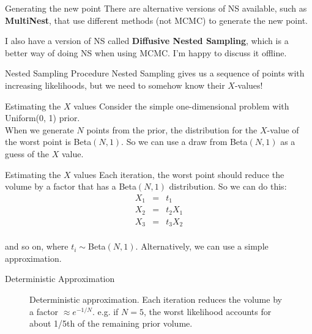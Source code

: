\documentclass{beamer}
\begin{document}
\begin{frame}[t]{Generating the new point}
There are alternative versions of NS available, such as {\bf MultiNest}, that
use different methods (not MCMC) to generate the new point.\\
\vspace{20pt}

I also have a version of NS called {\bf Diffusive Nested Sampling}, which is
a better way of doing NS when using MCMC. I'm happy to discuss it offline.
\end{frame}


\begin{frame}[t]{Nested Sampling Procedure}
Nested Sampling gives us a sequence of points with increasing likelihoods,
but we need to somehow know their $X$-values!
\end{frame}

\begin{frame}[t]{Estimating the $X$ values}
Consider the simple one-dimensional problem with Uniform(0, 1) prior.\\

\vspace{20pt}
When we generate $N$ points from the prior, the distribution for the $X$-value
of the worst point is Beta$(N, 1)$. So we can use a draw from Beta$(N,1)$ as
a guess of the $X$ value.
\end{frame}

\begin{frame}[t]{Estimating the $X$ values}
Each iteration, the worst point should reduce the volume by a factor that has
a Beta$(N, 1)$ distribution. So we can do this:
\begin{eqnarray*}
X_1 &=& t_1\\
X_2 &=& t_2X_1\\
X_3 &=& t_3X_2\\
\end{eqnarray*}

and so on, where $t_i \sim $Beta$(N,1)$. Alternatively, we can use a simple
approximation.
\end{frame}

\begin{frame}[t]{Deterministic Approximation}
\begin{figure}[]    		
		\caption{Deterministic approximation. Each iteration reduces
the volume by a factor $\approx e^{-1/N}$. e.g. if $N=5$, the worst likelihood
accounts for about 1/5th of the remaining prior volume.}
\end{figure}
\end{frame}
\end{document}
